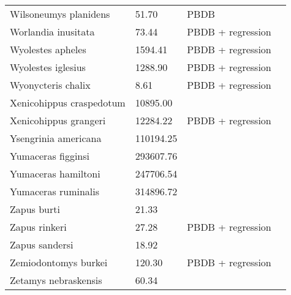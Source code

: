 \documentclass{article}
\begin{document}
\begin{center}
\begin{longtable}{p{} p{} p{} p{}}
    Wilsoneumys planidens & 51.70 & PBDB &  \\ 
    Worlandia inusitata & 73.44 & PBDB + regression &  \\ 
    Wyolestes apheles & 1594.41 & PBDB + regression &  \\ 
    Wyolestes iglesius & 1288.90 & PBDB + regression &  \\ 
    Wyonycteris chalix & 8.61 & PBDB + regression &  \\ 
    Xenicohippus craspedotum & 10895.00 & \cite{McKenna2011} &  \\ 
    Xenicohippus grangeri & 12284.22 & PBDB + regression &  \\ 
    Ysengrinia americana & 110194.25 & \cite{Tomiya2013} &  \\ 
    Yumaceras figginsi & 293607.76 & \cite{Tomiya2013} &  \\ 
    Yumaceras hamiltoni & 247706.54 & \cite{Tomiya2013} &  \\ 
    Yumaceras ruminalis & 314896.72 & \cite{Tomiya2013} &  \\ 
    Zapus burti & 21.33 & \cite{Tomiya2013} &  \\ 
    Zapus rinkeri & 27.28 & PBDB + regression &  \\ 
    Zapus sandersi & 18.92 & \cite{Tomiya2013} &  \\ 
    Zemiodontomys burkei & 120.30 & PBDB + regression &  \\ 
    Zetamys nebraskensis & 60.34 & \cite{Tomiya2013} &  \\ 
  \end{longtable}
\end{center}

\end{document}
